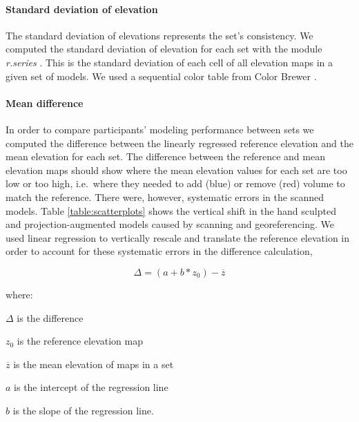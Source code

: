 \documentclass[prodmode,acmtochi]{acmsmall} %
\begin{document}
\paragraph{Standard deviation of elevation}
The standard deviation of elevations 
represents the set's consistency.
We computed 
the standard deviation of elevation for each set
with the module \textit{r.series} \cite{r.series}.
This is the standard deviation of each cell 
of all elevation maps in a given set of models.
We used a sequential color table from Color Brewer
\cite{Brewer1994,ColorBrewer}.

\paragraph{Mean difference}
In order to compare participants' modeling performance 
between sets we computed the difference 
between the linearly regressed reference elevation and 
the mean elevation for each set.
%
The difference between the reference 
and mean elevation maps should show
where the mean elevation values for each set 
are too low or too high, 
i.e.~where they needed to add (blue) 
or remove (red) volume to match the reference. 
%
There were, however, systematic errors 
in the scanned models.
%
Table \ref{table:scatterplots} shows the vertical shift 
in the hand sculpted and projection-augmented models 
caused by scanning and georeferencing.
%
We used linear regression 
to vertically rescale and translate the reference elevation 
in order to account for these systematic errors
in the difference calculation,

\begin{equation}
\label{eq:regressed_mean_difference}
\Delta = (a + b * z_0) - \overline{z}
\end{equation}

where:

\hspace*{1em} $\Delta$ is the difference

\hspace*{1em} $z_0$ is the reference elevation map

\hspace*{1em} $\overline{z}$ is the mean elevation of maps in a set

\hspace*{1em} $a$ is the intercept of the regression line

\hspace*{1em} $b$ is the slope of the regression line.\\
\end{document}

